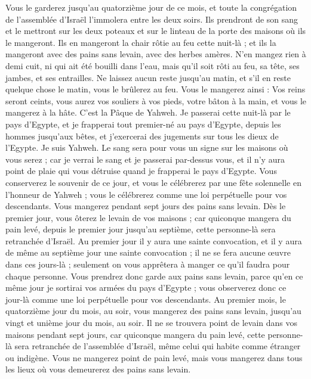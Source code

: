 \begin{multicols}{2}
Vous le garderez jusqu'au quatorzième jour de ce mois, et toute la congrégation de l'assemblée d'Israël l’immolera entre les deux soirs.
Ils prendront de son sang et le mettront sur les deux poteaux et sur le linteau de la porte des maisons où ils le mangeront.
Ils en mangeront la chair rôtie au feu cette nuit-là ; et ils la mangeront avec des pains sans levain, avec des herbes amères.
N'en mangez rien à demi cuit, ni qui ait été bouilli dans l'eau, mais qu'il soit rôti au feu, sa tête, ses jambes, et ses entrailles.
Ne laissez aucun reste jusqu’au matin, et s'il en reste quelque chose le matin, vous le brûlerez au feu.
Vous le mangerez ainsi : Vos reins seront ceints, vous aurez vos souliers à vos pieds, votre bâton à la main, et vous le mangerez à la hâte. C'est la Pâque de Yahweh.
Je passerai cette nuit-là par le pays d'Egypte, et je frapperai tout premier-né au pays d'Egypte, depuis les hommes jusqu’aux bêtes, et j'exercerai des jugements sur tous les dieux de l'Egypte. Je suis Yahweh.
Le sang sera pour vous un signe sur les maisons où vous serez ; car je verrai le sang et je passerai par-dessus vous, et il n'y aura point de plaie qui vous détruise quand je frapperai le pays d'Egypte.
Vous conserverez le souvenir de ce jour, et vous le célébrerez par une fête solennelle en l’honneur de Yahweh ; vous le célébrerez comme une loi perpétuelle pour vos descendants.
Vous mangerez pendant sept jours des pains sans levain. Dès le premier jour, vous ôterez le levain de vos maisons ; car quiconque mangera du pain levé, depuis le premier jour jusqu’au septième, cette personne-là sera retranchée d'Israël.
Au premier jour il y aura une sainte convocation, et il y aura de même au septième jour une sainte convocation ; il ne se fera aucune œuvre dans ces jours-là ; seulement on vous apprêtera à manger ce qu'il faudra pour chaque personne.
Vous prendrez donc garde aux pains sans levain, parce qu'en ce même jour je sortirai vos armées du pays d'Egypte ; vous observerez donc ce jour-là comme une loi perpétuelle pour vos descendants.
Au premier mois, le quatorzième jour du mois, au soir, vous mangerez des pains sans levain, jusqu'au vingt et unième jour du mois, au soir.
Il ne se trouvera point de levain dans vos maisons pendant sept jours, car quiconque mangera du pain levé, cette personne-là sera retranchée de l’assemblée d'Israël, même celui qui habite comme étranger ou indigène.
Vous ne mangerez point de pain levé, mais vous mangerez dans tous les lieux où vous demeurerez des pains sans levain.

\end{multicols}

